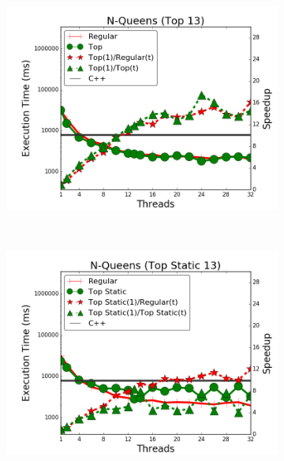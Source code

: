 \begin{figure}[]
        \centering
        \begin{subfigure}[b]{\plotsize\textwidth}
           \includegraphics[width=\textwidth]{experiments/coordination/cmp-top-8queens-13.png}
           \mycap{}
           \label{fig:coordination:coord_13queenstop}
        \end{subfigure}
        ~
        \begin{subfigure}[b]{\plotsize\textwidth}
           \includegraphics[width=\textwidth]{experiments/coordination/cmp-top-static-8queens-13.png}
           \mycap{}
           \label{fig:coordination:coord_13queenstopstatic}
        \end{subfigure} \\

\end{figure}
